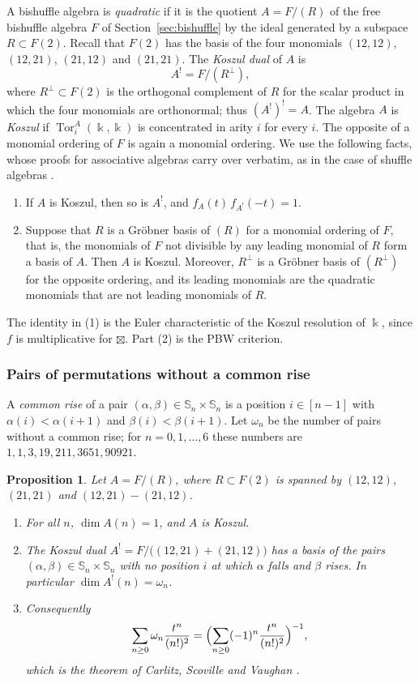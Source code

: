 \documentclass[11pt]{amsart}
\newtheorem{proposition}[theorem]{Proposition}
\theoremstyle{definition}
\theoremstyle{remark}
\newcommand{\bS}{\mathbb{S}}
\newcommand{\kk}{\Bbbk}
\begin{document}
A bishuffle algebra is \emph{quadratic} if it is the quotient $A=F/(R)$ of the free bishuffle algebra $F$ of Section~\ref{sec:bishuffle} by the ideal generated by a subspace $R\subset F(2)$. Recall that $F(2)$ has the basis of the four monomials $(12,12)$, $(12,21)$, $(21,12)$ and $(21,21)$. The \emph{Koszul dual} of $A$ is
\[
A^!=F/(R^\perp),
\]
where $R^\perp\subset F(2)$ is the orthogonal complement of $R$ for the scalar product in which the four monomials are orthonormal; thus $(A^!)^!=A$. The algebra $A$ is \emph{Koszul} if $\operatorname{Tor}^A_i(\kk,\kk)$ is concentrated in arity $i$ for every $i$. The opposite of a monomial ordering of $F$ is again a monomial ordering. We use the following facts, whose proofs for associative algebras \cite{Priddy,PP,LV} carry over verbatim, as in the case of shuffle algebras \cite{DK}.
\begin{enumerate}
\item If $A$ is Koszul, then so is $A^!$, and $f_A(t)\,f_{A^!}(-t)=1$.
\item Suppose that $R$ is a Gr\"obner basis of $(R)$ for a monomial ordering of $F$, that is, the monomials of $F$ not divisible by any leading monomial of $R$ form a basis of $A$. Then $A$ is Koszul. Moreover, $R^\perp$ is a Gr\"obner basis of $(R^\perp)$ for the opposite ordering, and its leading monomials are the quadratic monomials that are not leading monomials of $R$.
\end{enumerate}
The identity in (1) is the Euler characteristic of the Koszul resolution of $\kk$, since $f$ is multiplicative for $\boxtimes$. Part (2) is the PBW criterion.

\subsubsection{Pairs of permutations without a common rise}
A \emph{common rise} of a pair $(\alpha,\beta)\in\bS_n\times\bS_n$ is a position $i\in[n-1]$ with $\alpha(i)<\alpha(i+1)$ and $\beta(i)<\beta(i+1)$. Let $\omega_n$ be the number of pairs without a common rise; for $n=0,1,\dots,6$ these numbers are $1,1,3,19,211,3651,90921$.

\begin{proposition}\label{prop:csv}
Let $A=F/(R)$, where $R\subset F(2)$ is spanned by $(12,12)$, $(21,21)$ and $(12,21)-(21,12)$.
\begin{enumerate}
\item For all $n$, $\dim A(n)=1$, and $A$ is Koszul.
\item The Koszul dual $A^!=F/\bigl((12,21)+(21,12)\bigr)$ has a basis of the pairs $(\alpha,\beta)\in\bS_n\times\bS_n$ with no position $i$ at which $\alpha$ falls and $\beta$ rises. In particular $\dim A^!(n)=\omega_n$.
\item Consequently
\[
\sum_{n\ge0}\omega_n\frac{t^n}{(n!)^2}=\Bigl(\sum_{n\ge0}(-1)^n\frac{t^n}{(n!)^2}\Bigr)^{-1},
\]
which is the theorem of Carlitz, Scoville and Vaughan \cite{CSV}.
\end{enumerate}
\end{proposition}
\end{document}
